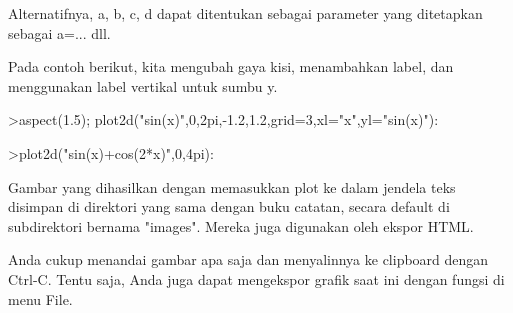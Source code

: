 \begin{eulernotebook}
\begin{eulercomment}
Alternatifnya, a, b, c, d dapat ditentukan sebagai parameter yang
ditetapkan sebagai a=... dll.

Pada contoh berikut, kita mengubah gaya kisi, menambahkan label, dan
menggunakan label vertikal untuk sumbu y.
\end{eulercomment}
\begin{eulerprompt}
>aspect(1.5); plot2d("sin(x)",0,2pi,-1.2,1.2,grid=3,xl="x",yl="sin(x)"):
\end{eulerprompt}
\begin{eulerprompt}
>plot2d("sin(x)+cos(2*x)",0,4pi):
\end{eulerprompt}
\begin{eulercomment}
Gambar yang dihasilkan dengan memasukkan plot ke dalam jendela teks
disimpan di direktori yang sama dengan buku catatan, secara default di
subdirektori bernama "images". Mereka juga digunakan oleh ekspor HTML.

Anda cukup menandai gambar apa saja dan menyalinnya ke clipboard
dengan Ctrl-C. Tentu saja, Anda juga dapat mengekspor grafik saat ini
dengan fungsi di menu File.


\end{eulercomment}
\end{eulernotebook}
